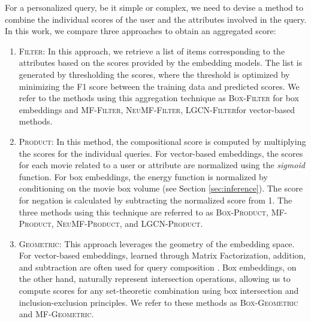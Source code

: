For a personalized query, be it simple or complex, we need to devise a method to combine the individual scores of the user and the attributes involved in the query. In this work, we compare three approaches to obtain an aggregated score:
\begin{enumerate}[leftmargin=*]
    \item \textsc{Filter}: In this approach, we retrieve a list of items corresponding to the attributes based on the scores provided by the embedding models. The list is generated by thresholding the scores, where the threshold is optimized by minimizing the F1 score between the training data and predicted scores. We refer to the methods using this aggregation technique as \textsc{Box-Filter} for box embeddings and \textsc{MF-Filter}, \textsc{NeuMF-Filter}, \textsc{LGCN-Filter}for vector-based methods.
    \item \textsc{Product}: In this method, the compositional score is computed by multiplying the scores for the individual queries. For vector-based embeddings, the scores for each movie related to a user or attribute are normalized using the \textit{sigmoid} function. For box embeddings, the energy function is normalized by conditioning on the movie box volume (see Section \ref{sec:inference}). The score for negation is calculated by subtracting the normalized score from 1. The three methods using this technique are referred to as \textsc{Box-Product}, \textsc{MF-Product}, \textsc{NeuMF-Product}, and \textsc{LGCN-Product}.
    \item \textsc{Geometric}: This approach leverages the geometry of the embedding space. For vector-based embeddings, learned through Matrix Factorization, addition, and subtraction are often used for query composition \citep{mikolov2013efficient}. Box embeddings, on the other hand, naturally represent intersection operations, allowing us to compute scores for any set-theoretic combination using box intersection and inclusion-exclusion principles. We refer to these methods as \textsc{Box-Geometric} and \textsc{MF-Geometric}.
\end{enumerate}
 